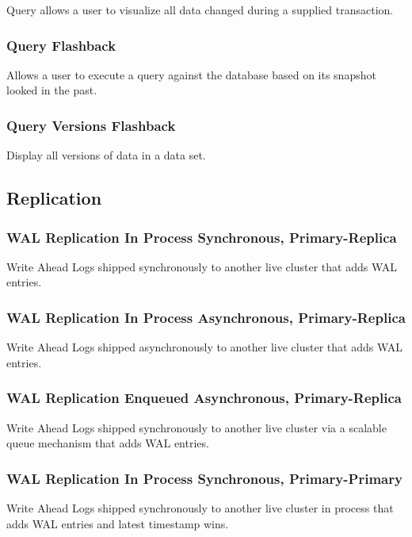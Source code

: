 Query allows a user to visualize all data changed during a supplied transaction.

\subsubsection{Query Flashback}

Allows a user to execute a query against the database based on its snapshot
looked in the past.

\subsubsection{Query Versions Flashback}

Display all versions of data in a data set.

\subsection{Replication}

\subsubsection{WAL Replication In Process Synchronous, Primary-Replica}

Write Ahead Logs shipped synchronously to another live cluster that adds WAL
entries.

\subsubsection{WAL Replication In Process Asynchronous, Primary-Replica}

Write Ahead Logs shipped asynchronously to another live cluster that adds WAL
entries.

\subsubsection{WAL Replication Enqueued Asynchronous, Primary-Replica}

Write Ahead Logs shipped synchronously to another live cluster via a scalable
queue mechanism that adds WAL entries.

\subsubsection{WAL Replication In Process Synchronous, Primary-Primary}

Write Ahead Logs shipped synchronously to another live cluster in process that
adds WAL entries and latest timestamp wins.

